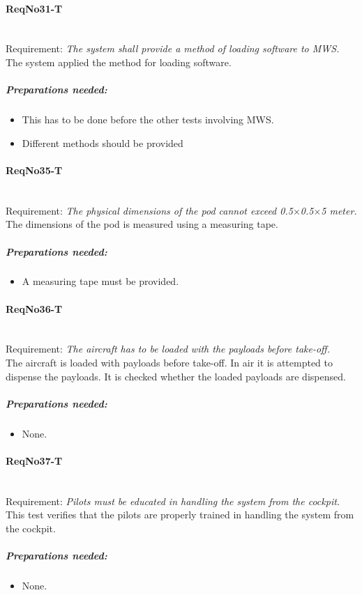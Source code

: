 \paragraph{ReqNo31-T}\mbox{}\\ %
Requirement: \textit{The system shall provide a method of loading software to MWS.}\\
The system applied the method for loading software.
	\subparagraph{Preparations needed:}
	\begin{itemize}
	\item This has to be done before the other tests involving MWS.
	\item Different methods should be provided
	\end{itemize}

\paragraph{ReqNo35-T}\mbox{}\\ %
Requirement: \textit{The physical dimensions of the pod cannot exceed 0.5$\times$0.5$\times$5 meter.}
\\
The dimensions of the pod is measured using a measuring tape.

	\subparagraph{Preparations needed:}
	\begin{itemize}
	\item A measuring tape must be provided.
	\end{itemize}

\paragraph{ReqNo36-T}\mbox{}\\ %
Requirement: \textit{The aircraft has to be loaded with the payloads before take-off.}
\\
The aircraft is loaded with payloads before take-off. In air it is attempted to dispense the payloads. It is checked whether the loaded payloads are dispensed.
\\
	\subparagraph{Preparations needed:}
	\begin{itemize}
	\item None.
	\end{itemize} 

\paragraph{ReqNo37-T}\mbox{}\\ %
Requirement: \textit{Pilots must be educated in handling the system from the cockpit.}
\\
This test verifies that the pilots are properly trained in handling the system from the cockpit.
\\
	\subparagraph{Preparations needed:}
	\begin{itemize}
	\item None.
	\end{itemize} 


